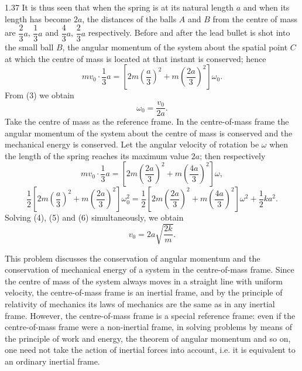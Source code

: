 \begin{solution}{1.37}
It is thus seen that when the spring is at its natural length $a$ and when its length has become $2a$, the distances of the balls $A$ and $B$ from the centre of mass are $\dfrac{2}{3}a$, $\dfrac{1}{3}a$ and $\dfrac{4}{3}a$, $\dfrac{2}{3}a$ respectively. Before and after the lead bullet is shot into the small ball $B$, the angular momentum of the system about the spatial point $C$ at which the centre of mass is located at that instant is conserved; hence
\begin{equation}
mv_0\cdot\frac{1}{3}a=\left[2m\left(\frac{a}{3}\right)^2+m\left(\frac{2a}{3}\right)^2\right]\omega_0. \tag{3}
\end{equation}
From (3) we obtain
\begin{equation}
\omega_0=\frac{v_0}{2a}. \tag{4}
\end{equation}
Take the centre of mass as the reference frame. In the centre-of-mass frame the angular momentum of the system about the centre of mass is conserved and the mechanical energy is conserved. Let the angular velocity of rotation be $\omega$ when the length of the spring reaches its maximum value $2a$; then respectively
\begin{equation}
mv_0\cdot\frac{1}{3}a=\left[2m\left(\frac{2a}{3}\right)^2+m\left(\frac{4a}{3}\right)^2\right]\omega, \tag{5}
\end{equation}
\begin{equation}
\frac{1}{2}\left[2m\left(\frac{a}{3}\right)^2+m\left(\frac{2a}{3}\right)^2\right]\omega_0^2
=\frac{1}{2}\left[2m\left(\frac{2a}{3}\right)^2+m\left(\frac{4a}{3}\right)^2\right]\omega^2+\frac{1}{2}ka^2. \tag{6}
\end{equation}
Solving (4), (5) and (6) simultaneously, we obtain
\[
v_0=2a\sqrt{\frac{2k}{m}}.
\]

\begin{commentary}
This problem discusses the conservation of angular momentum and the conservation of mechanical energy of a system in the centre-of-mass frame. Since the centre of mass of the system always moves in a straight line with uniform velocity, the centre-of-mass frame is an inertial frame, and by the principle of relativity of mechanics its laws of mechanics are the same as in any inertial frame. However, the centre-of-mass frame is a special reference frame: even if the centre-of-mass frame were a non-inertial frame, in solving problems by means of the principle of work and energy, the theorem of angular momentum and so on, one need not take the action of inertial forces into account, i.e. it is equivalent to an ordinary inertial frame.
\end{commentary}

\end{solution}

